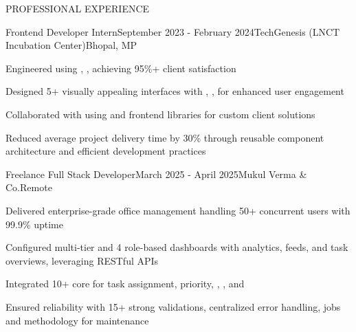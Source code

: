 \documentclass{resume}
\begin{document}
\begin{rSection}{PROFESSIONAL EXPERIENCE}

\begin{rExperience}{Frontend Developer Intern}{September 2023 - February 2024}{TechGenesis (LNCT Incubation Center)}{Bhopal, MP}
\item Engineered  using , ,  achieving 95\%+ client satisfaction
\item Designed 5+ visually appealing interfaces with , ,  for enhanced user engagement
\item Collaborated with  using  and frontend libraries for custom client solutions
\item Reduced average project delivery time by 30\% through reusable component architecture and efficient development practices
\end{rExperience}

\begin{rExperience}{Freelance Full Stack Developer}{March 2025 - April 2025}{Mukul Verma \& Co.}{Remote}
\item Delivered enterprise-grade office management  handling 50+ concurrent users with 99.9\% uptime
\item Configured multi-tier  and 4 role-based dashboards with analytics, feeds, and task overviews, leveraging RESTful APIs
\item Integrated 10+ core  for task assignment, priority, , , and 
\item Ensured reliability with 15+ strong validations, centralized error handling,  jobs and  methodology for maintenance
\end{rExperience}

\end{rSection}
\end{document}
